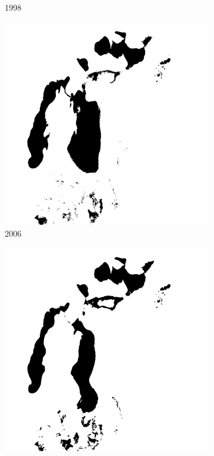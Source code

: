 \documentclass[12pt,a4paper]{article}
\begin{document}
\begin{figure}[H]
\begin{subfigure}[b]{0.19\textwidth}
        \caption{1998}
    \end{subfigure}
    \begin{subfigure}[b]{0.19\textwidth}
        \centering
        \includegraphics[width=\textwidth]{../img/2006w.jpg}
        \caption{2006}
    \end{subfigure}
    \begin{subfigure}[b]{0.19\textwidth}
        \centering
        \includegraphics[width=\textwidth]{../img/2010w.jpg}

\end{subfigure}
\end{figure}
\end{document}
